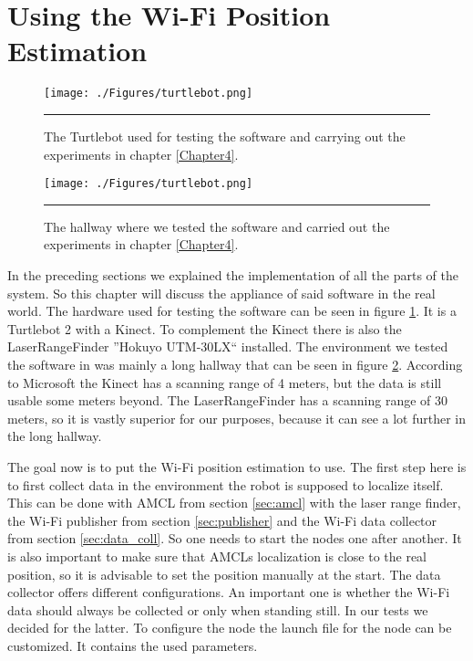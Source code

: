 \section{Using the Wi-Fi Position Estimation}
\begin{figure}[htbp]
	\centering
		\texttt{[image: ./Figures/turtlebot.png]}
		\rule{35em}{0.5pt}
	\caption[Turtlebot]{The Turtlebot used for testing the software and carrying out the experiments in chapter \ref{Chapter4}.}
	\label{fig:turtlebot}
\end{figure}
\begin{figure}[htbp]
	\centering
		\texttt{[image: ./Figures/turtlebot.png]}
		\rule{35em}{0.5pt}
	\caption[Turtlebot]{The hallway where we tested the software and carried out the experiments in chapter \ref{Chapter4}.}
	\label{fig:hallway}
\end{figure}
In the preceding sections we explained the implementation of all the parts of the system. So this chapter will discuss the appliance of said software in the real world. The hardware used for testing the software can be seen in figure \ref{fig:turtlebot}. It is a Turtlebot 2 with a Kinect. To complement the Kinect there is also the \gls{LaserRangeFinder} ''Hokuyo UTM-30LX`` installed. The environment we tested the software in was mainly a long hallway that can be seen in figure \ref{fig:hallway}. According to Microsoft the Kinect has a scanning range of 4 meters, but the data is still usable some meters beyond\citep{ece21221}. The \gls{LaserRangeFinder} has a scanning range of 30 meters\citep{laser}, so it is vastly superior for our purposes, because it can see a lot further in the long hallway. 

The goal now is to put the Wi-Fi position estimation to use. The first step here is to first collect data in the environment the robot is supposed to localize itself. This can be done with AMCL from section \ref{sec:amcl} with the laser range finder, the Wi-Fi publisher from section \ref{sec:publisher} and the Wi-Fi data collector from section \ref{sec:data_coll}. So one needs to start the nodes one after another. It is also important to make sure that AMCLs localization is close to the real position, so it is advisable to set the position manually at the start. The data collector offers different configurations. An important one is whether the Wi-Fi data should always be collected or only when standing still. In our tests we decided for the latter. To configure the node the launch file for the node can be customized. It contains the used parameters.

